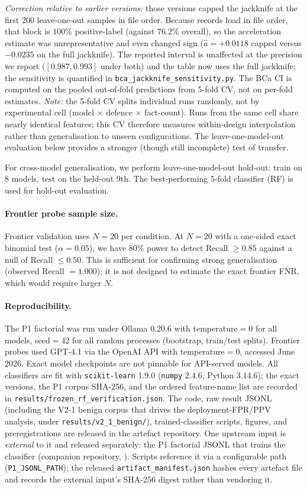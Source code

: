 \documentclass{article}
\begin{document}
\emph{Correction relative to earlier versions:} those versions capped the jackknife at the first $200$ leave-one-out samples in file order. Because records load in file order, that block is $100\%$ positive-label (against $76.2\%$ overall), so the acceleration estimate was unrepresentative and even changed sign ($\hat a = +0.0118$ capped versus $-0.0235$ on the full jackknife). The reported interval is unaffected at the precision we report ($[0.987, 0.993]$ under both) and the table now uses the full jackknife; the sensitivity is quantified in \texttt{bca\_jackknife\_sensitivity.py}. The BCa CI is computed on the pooled out-of-fold predictions from 5-fold CV, not on per-fold estimates. \emph{Note:} the 5-fold CV splits individual runs randomly, not by experimental cell (model $\times$ defence $\times$ fact-count). Runs from the same cell share nearly identical features; this CV therefore measures within-design interpolation rather than generalisation to unseen configurations. The leave-one-model-out evaluation below provides a stronger (though still incomplete) test of transfer.

For cross-model generalisation, we perform leave-one-model-out hold-out: train on 8 models, test on the held-out 9th. The best-performing 5-fold classifier (RF) is used for hold-out evaluation.

\paragraph{Frontier probe sample size.} Frontier validation uses $N{=}20$ per condition. At $N{=}20$ with a one-sided exact binomial test ($\alpha = 0.05$), we have 80\% power to detect Recall $\geq 0.85$ against a null of Recall $\leq 0.50$. This is sufficient for confirming strong generalisation (observed Recall $= 1.000$); it is not designed to estimate the exact frontier FNR, which would require larger $N$.

\paragraph{Reproducibility.} The P1 factorial was run under Ollama 0.20.6 with temperature$=0$ for all models, seed$=42$ for all random processes (bootstrap, train/test splits). Frontier probes used GPT-4.1 via the OpenAI API with temperature$=0$, accessed June 2026. Exact model checkpoints are not pinnable for API-served models. All classifiers are fit with \texttt{scikit-learn} $1.9.0$ (\texttt{numpy} $2.4.6$, Python $3.14.6$); the exact versions, the P1 corpus SHA-256, and the ordered feature-name list are recorded in \texttt{results/frozen\_rf\_verification.json}. The code, raw result JSONL (including the V2-1 benign corpus that drives the deployment-FPR/PPV analysis, under \texttt{results/v2\_1\_benign/}), trained-classifier scripts, figures, and preregistrations are released in the artefact repository. One upstream input is \emph{external} to it and released separately: the P1 factorial JSONL that trains the classifier (companion repository, \citealp{leong2026defense}). Scripts reference it via a configurable path (\texttt{P1\_JSONL\_PATH}); the released \texttt{artifact\_manifest.json} hashes every artefact file and records the external input's SHA-256 digest rather than vendoring it.
\end{document}
